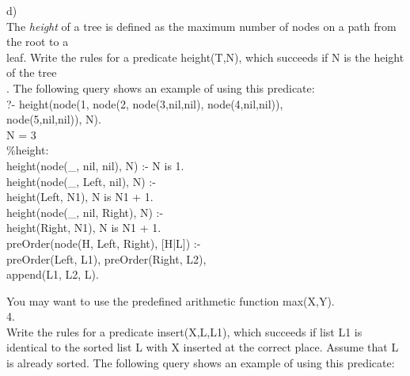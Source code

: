 \documentclass[12pt]{article}
\begin{document}
\begin{flushleft}
\qquad d)\\
\qquad The \textit{height} of a tree is defined as the maximum number of nodes on a path from the root to a\\
\qquad leaf. Write the rules for a predicate {\selectfont height(T,N)}, which succeeds if {\selectfont N} is the height of the tree\\
.  The following query shows an example of using this predicate:\\
[2mm]
{\selectfont
\qquad \qquad ?- height(node(1, node(2, node(3,nil,nil), node(4,nil,nil)),\\
\qquad \qquad node(5,nil,nil)), N).\\
\qquad \qquad N = 3\\
[6mm]	


\qquad \qquad \qquad \%height:\\	
\qquad \qquad \qquad height(node(\_, nil, nil), N) :- N is 1.\\
\qquad \qquad \qquad height(node(\_, Left, nil), N) :-\\
\qquad \qquad \qquad \qquad \qquad \qquad \qquad \qquad \qquad \qquad height(Left, N1), N is N1 + 1.\\
\qquad \qquad \qquad height(node(\_, nil, Right), N) :-\\
\qquad \qquad \qquad \qquad \qquad \qquad \qquad \qquad \qquad \qquad height(Right, N1), N is N1 + 1.\\
\qquad \qquad \qquad  preOrder(node(H, Left, Right), [H|L]) :-\\
\qquad \qquad \qquad \qquad \qquad \qquad preOrder(Left, L1), preOrder(Right, L2),\\
\qquad \qquad \qquad \qquad \qquad \qquad \qquad \qquad \qquad \qquad \qquad \qquad \qquad append(L1, L2, L).
}

\qquad You may want to use the predefined arithmetic function {\selectfont max(X,Y)}.\\
[4mm]

4.\\
Write the rules for a predicate {\selectfont insert(X,L,L1)}, which succeeds if list {\selectfont L1} is
identical to the sorted list {\selectfont L} with {\selectfont X} inserted at the correct place. Assume that {\selectfont L} is already sorted. The following query shows an example of using this predicate:\\
[2mm]


\end{flushleft}
\end{document}
